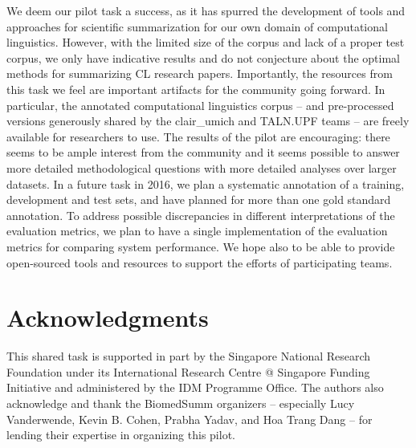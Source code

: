 \documentclass[11pt]{article}
\begin{document}
We deem our pilot task a success, as it has spurred the development of
tools and approaches for scientific summarization for our own domain
of computational linguistics.
However, with the limited size of the corpus and lack of a proper test
corpus, we only have indicative results and do not conjecture about
the optimal methods for summarizing CL research papers.  Importantly,
the resources from this task we feel are important artifacts for the
community going forward.  In particular, the annotated computational
linguistics corpus -- and pre-processed versions generously shared by
the clair\_umich and TALN.UPF teams -- are freely available for
researchers to use.
The results of the pilot are encouraging: there seems to be ample
interest from the community and it seems possible to answer more
detailed methodological questions with more detailed analyses over
larger datasets.  In a future task in 2016, we plan a systematic
annotation of a training, development and test sets, and have planned
for more than one gold standard annotation. To address possible discrepancies in
different interpretations of the evaluation metrics, we plan to have a single 
implementation of the evaluation metrics for comparing system performance. 
We hope also to be able to provide open-sourced tools and resources
to support the efforts of participating teams.



\section{Acknowledgments}
This shared task is supported in part by the Singapore National
Research Foundation under its International Research Centre @
Singapore Funding Initiative and administered by the IDM Programme
Office.  The authors also acknowledge and thank the BiomedSumm
organizers -- especially Lucy Vanderwende, Kevin B. Cohen, Prabha
Yadav, and Hoa Trang Dang -- for lending their expertise in organizing
this pilot.
\end{document}
